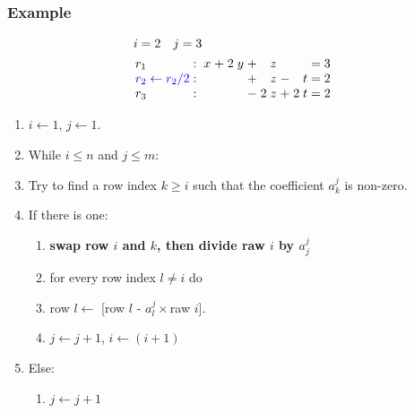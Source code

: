 \documentclass{beamer}
\begin{document}
\begin{frame}
  \frametitle{Example}
  
  \[\arraycolsep=1.4pt
  \begin{aligned}
    &i = 2 \quad j = 3\\
      &
    \begin{array}{lcccccccccccccc}
        r_1  & : &  & x & + & 2 & y & + &  & z &  & & & = & 3\\
        {\color{blue} r_2 \leftarrow r_2/2} & : &   &   &  &   &  & + &   & z & - &  & t  & = & 2\\
        r_3  & : &  &   &  &  &   & - & 2 & z & + & 2 & t & = & 2\\
    \end{array}
  \end{aligned}
  \]
  
  
  \begin{enumerate}
  \item $i \leftarrow 1$, $j \leftarrow 1$.
  \item While $i \le n$ and $j \le m$:
  \item Try to find a row index $k \ge i$ such that the coefficient $a^j_k$ is non-zero.
  \item If there is one:
    \begin{enumerate}
    \item {\bf swap row $i$ and $k$, then divide raw $i$ by $a^{j}_j$}
    \item for every row index $l \neq i$ do 
    \item row $l \leftarrow$ [row $l$ - $a^j_l\times$raw $i$].
    \item $j \leftarrow j+1$, $i \leftarrow (i+1)$
    \end{enumerate}
  \item Else:
    \begin{enumerate}
    \item $j \leftarrow j+1$
    \end{enumerate}
  \end{enumerate}
  
\end{frame}
\end{document}
